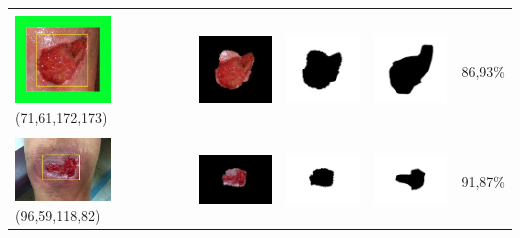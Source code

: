 \begin{table}[H]
\begin{tabular}{|m{1.0in}|m{1.0in}|m{1.0in}|m{1.0in}|m{0.6in}|}
		&  &  & \\
		\includegraphics[width=1.0in]{gambar/hasil_segmentasi/luka_merah/image_26_rect.jpg} {\centering\fontsize{10}{10}\selectfont(71,61,172,173)}&
		\includegraphics[width=1.0in]{gambar/hasil_segmentasi/luka_merah/result_26.jpg}&
		\includegraphics[width=1.0in]{gambar/hasil_segmentasi/luka_merah/mask_r_26.jpg}&
		\includegraphics[width=1.0in]{gambar/hasil_segmentasi/luka_merah/26_r.jpg}&
		86,93\% \\
		\hline

		&  &  & \\
		\includegraphics[width=1.0in]{gambar/hasil_segmentasi/luka_merah/image_29_rect.jpg} {\centering\fontsize{10}{10}\selectfont(96,59,118,82)}&
		\includegraphics[width=1.0in]{gambar/hasil_segmentasi/luka_merah/result_29.jpg}&
		\includegraphics[width=1.0in]{gambar/hasil_segmentasi/luka_merah/mask_r_29.jpg}&
		\includegraphics[width=1.0in]{gambar/hasil_segmentasi/luka_merah/29_r.jpg}&
		91,87\% \\
		\hline


\end{tabular}
\end{table}
